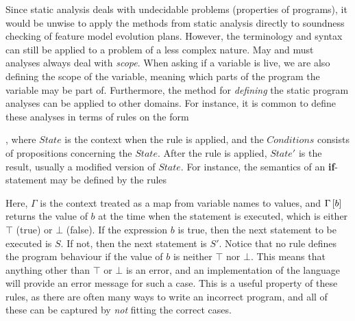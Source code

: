 Since static analysis deals with undecidable problems (properties of programs), it would be unwise to apply the methods from static analysis directly to soundness checking of feature model evolution plans. However, the terminology and syntax can still be applied to a problem of a less complex nature. May and must analyses always deal with \emph{scope}. When asking if a variable is live, we are also defining the scope of the variable, meaning which parts of the program the variable may be part of. Furthermore, the method for \emph{defining} the static program analyses can be applied to other domains. For instance, it is common to define these analyses in terms of rules on the form

\begin{prooftree}
\end{prooftree}

, where $State$ is the context when the rule is applied, and the $Conditions$ consists of propositions concerning the $State$. After the rule is applied, $State'$ is the result, usually a modified version of $State$. For instance, the semantics of an \textbf{if}-statement may be defined by the rules

\begin{minipage}{0.5\textwidth}
   \footnotesize
\begin{prooftree}
\end{prooftree}
\end{minipage}
\begin{minipage}{0.5\textwidth}
   \footnotesize
\begin{prooftree}
\end{prooftree}
\end{minipage}

Here, $\Gamma$ is the context treated as a map from variable names to values, and $\lookup{\Gamma}{b}$ returns the value of $b$ at the time when the statement is executed, which is either $\top$ (true) or $\bot$ (false). If the expression $b$ is true, then the next statement to be executed is $S$. If not, then the next statement is $S'$. Notice that no rule defines the program behaviour if the value of $b$ is neither $\top$ nor $\bot$. This means that anything other than $\top$ or $\bot$ is an error, and an implementation of the language will provide an error message for such a case. This is a useful property of these rules, as there are often many ways to write an incorrect program, and all of these can be captured by \emph{not} fitting the correct cases.

